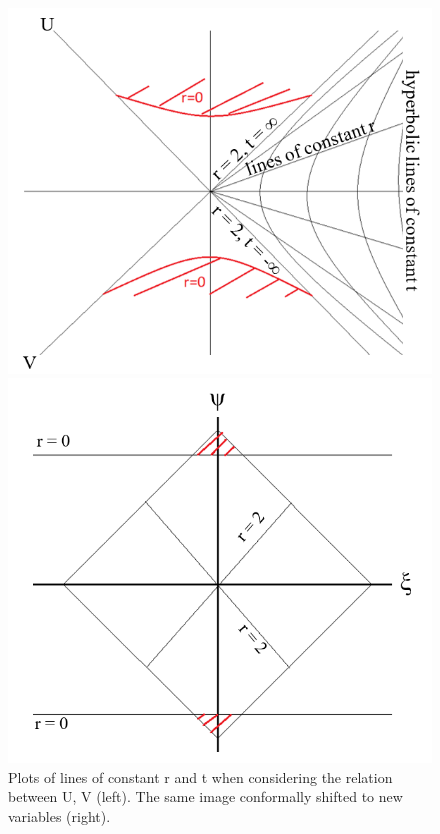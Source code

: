 \documentclass[oneside,openright,frontopenright, singlespacing]{dmathesis}
\begin{document}
\begin{figure}[!ht]
	\centering
	\begin{minipage}{0.5\textwidth}
		\centering
		\includegraphics[width=0.9\linewidth]{img/carter-penrose1}
	\end{minipage}%
	\hfill
	\begin{minipage}{0.5\textwidth}
		\centering
		\includegraphics[width=0.9\linewidth]{img/carter-penrose2}
	\end{minipage}
	\caption{Plots of lines of constant r and t when considering the relation between U, V (left). The same image conformally shifted to new variables (right).}
	\label{fig:Figure6.1}
\end{figure}
\end{document}
